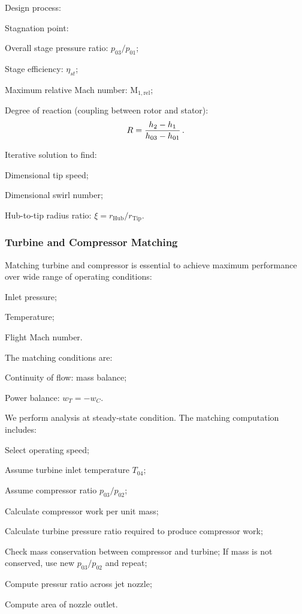 Design process:
\begin{itemizePacked}
\item Stagnation point:
  \begin{itemizePacked}
  \item Overall stage pressure ratio: $p_{03}/p_{01}$;
  \item Stage efficiency: $\eta_{st}$;
  \item Maximum relative Mach number: $\text{M}_{1,\text{rel}}$;
  \item Degree of reaction (coupling between rotor and stator):
    \[
      R = {\frac{h_2 - h_1}{h_{03} - h_{01}}} \,.
    \]
  \end{itemizePacked}
\item Iterative solution to find:
  \begin{itemizePacked}
  \item Dimensional tip speed;
  \item Dimensional swirl number;
  \item Hub-to-tip radius ratio: $\xi = r_\text{Hub}/r_\text{Tip}$.
  \end{itemizePacked}
\end{itemizePacked}

\subsubsection{Turbine and Compressor Matching}
Matching turbine and compressor is essential to achieve maximum performance over wide range of operating conditions:
\begin{itemizePacked}
\item Inlet pressure;
\item Temperature;
\item Flight Mach number.
\end{itemizePacked}
The matching conditions are:
\begin{itemizePacked}
\item Continuity of flow: mass balance;
\item Power balance: $w_T = - w_C$.
\end{itemizePacked}

We perform analysis at steady-state condition. The matching computation includes:
\begin{itemizePacked}
\item Select operating speed;
\item Assume turbine inlet temperature $T_{04}$;
\item Assume compressor ratio $p_{03}/p_{02}$;
\item Calculate compressor work per unit mass;
\item Calculate turbine pressure ratio required to produce compressor work;
\item Check mass conservation between compressor and turbine; If mass is not conserved, use new $p_{03}/p_{02}$ and repeat;
\item Compute pressur ratio across jet nozzle;
\item Compute area of nozzle outlet.
\end{itemizePacked}


